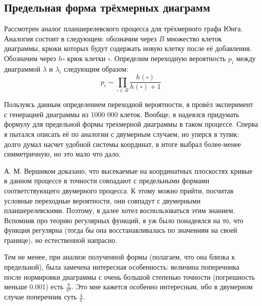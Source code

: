 \documentclass[12pt]{report}
\begin{document}
\newpage

\subsection*{Предельная форма трёхмерных диаграмм}
\hspace{\parindent} Рассмотрен аналог планшерелевского процесса для трёхмерного графа Юнга. Аналогия состоит в следующем: обозначим через $B$ множество клеток диаграммы, крюки которых будут содержать новую клетку после её добавления. Обозначим через $h{\square}$ крюк клетки $\square$. Определим переходную вероятность $p_i$ между диаграммой $\lambda$ и $\lambda_i$ следующим образом:
$$p_i \sim \prod\limits_{\square \in B}\frac{h(\square)}{h(\square) + 1}$$

Пользуясь данным определением переходной вероятности, я провёл эксперимент с генерацией диаграммы из 1000 000 клеток. Вообще, я надеялся придумать формулу для предельной формы трехмерной диаграммы в таком процессе. Сперва я пытался описать её по аналогии с двумерным случаем, но уперся в тупик: долго думал насчет удобной системы координат, в итоге выбрал более-менее симметричную, но это мало что дало. 

А. М. Вершиком доказано, что высекаемые на координатных плоскостях кривые в данном процессе в точности совпадают с предельными формами соответствующего двумерного процесса. К этому можно прийти, посчитав условные переходные вероятности, они совпадут с двумерными планшерелевскими. Поэтому, я далее хотел воспользоваться этим знанием. Вспомнив про теорию регулярных функций, я уж было понадеялся на то, что функция регулярна (тогда бы она восстанавливалась по значениям на своей границе), но естественной напрасно.

Тем не менее, при анализе полученной формы (полагаем, что она близка к предельной), была замечена интересная особенность: величина поперечника после нормировки диаграммы с очень большой степенью точности (погрешность меньше 0.001) есть $\frac{9}{\pi^2}$. Это мне кажется особенно интересным, ибо в двумерном случае поперечник суть $\frac{4}{\pi}$. 
\end{document}
